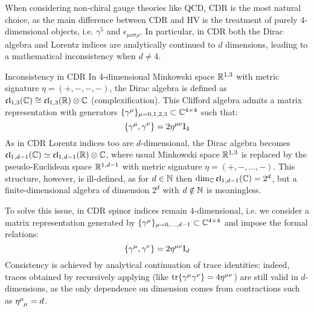 When considering non-chiral gauge theories like QCD, CDR is the most natural choice, as the main difference between CDR and HV is the treatment of purely $ 4 $-dimensional objects, i.e. $ \gamma^5 $ and $ \epsilon_{\mu \nu \sigma \rho} $. In particular, in CDR both the Dirac algebra and Lorentz indices are analytically continued to $ d $ dimensions, leading to a mathematical inconsistency when $ d \neq 4 $.

\begin{observation}{Inconsistency in CDR}{}
  In $ 4 $-dimensional Minkowski space $ \mathbb{R}^{1,3} $ with metric signature $ \eta = (+,-,-,-) $, the Dirac algebra is defined as $ \mathfrak{cl}_{1,3}(\mathbb{C}) \cong \mathfrak{cl}_{1,3}(\mathbb{R}) \otimes \mathbb{C} $ (complexification\footnotemark). This Clifford algebra admits a matrix representation with generators $ \{\gamma^\mu\}_{\mu = 0, 1, 2, 3} \subset \mathbb{C}^{4 \times 4} $ such that:
  \begin{equation}
    \{\gamma^\mu , \gamma^\nu\} = 2 \eta^{\mu \nu} \mathrm{I}_4
  \end{equation}
  As in CDR Lorentz indices too are $ d $-dimensional, the Dirac algebra becomes $ \mathfrak{cl}_{1,d-1}(\mathbb{C}) \simeq \mathfrak{cl}_{1,d-1}(\mathbb{R}) \otimes \mathbb{C} $, where usual Minkowski space $ \mathbb{R}^{1,3} $ is replaced by the pseudo-Euclidean space $ \mathbb{R}^{1,d-1} $ with metric signature $ \eta = (+,-,\dots,-) $. This structure, however, is ill-defined, as for $ d \in \mathbb{N} $ then $ \dim_{\mathbb{C}} \mathfrak{cl}_{1,d-1}(\mathbb{C}) = 2^d $, but a finite-dimensional algebra of dimension $ 2^d $ with $ d \notin \mathbb{N} $ is meaningless.

  To solve this issue, in CDR spinor indices remain $ 4 $-dimensional, i.e. we consider a matrix representation generated by $ \{\gamma^\mu\}_{\mu = 0, \dots, d-1} \subset \mathbb{C}^{4 \times 4} $ and impose the formal relations:
  \begin{equation}
    \{\gamma^\mu , \gamma^\nu\} = 2 \eta^{\mu \nu} \mathrm{I}_d
    \label{eq:gen-dir-alg}
  \end{equation}
  Consistency is achieved by analytical continuation of trace identities: indeed, traces obtained by recursively applying  (like $ \operatorname{tr}\{\gamma^\mu \gamma^\nu\} = 4 \eta^{\mu \nu} $) are still valid in $ d $-dimensions, as the only dependence on dimension comes from contractions such as $ \tensor{\eta}{^\mu_\mu} = d $.


\end{observation}
